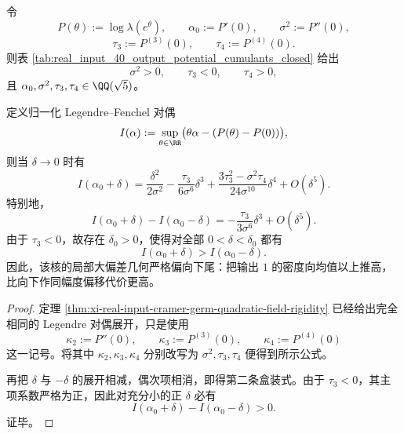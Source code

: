 \begin{theorem}[实输入四十状态核的局部大偏差率函数严格偏向下尾]\label{thm:xi-real-input40-local-rate-strict-downward-asymmetry}
令
\[
P(\theta):=\log\lambda(e^\theta),
\qquad
\alpha_0:=P'(0),
\qquad
\sigma^2:=P''(0),
\]
\[
\tau_3:=P^{(3)}(0),
\qquad
\tau_4:=P^{(4)}(0).
\]
则表 \ref{tab:real_input_40_output_potential_cumulants_closed} 给出
\[
\sigma^2>0,
\qquad
\tau_3<0,
\qquad
\tau_4>0,
\]
且 \(\alpha_0,\sigma^2,\tau_3,\tau_4\in\QQ(\sqrt5)\)。

定义归一化 Legendre--Fenchel 对偶
\[
I(\alpha):=\sup_{\theta\in\RR}\bigl(\theta\alpha-(P(\theta)-P(0))\bigr),
\]
则当 \(\delta\to 0\) 时有
\[
\boxed{\;
I(\alpha_0+\delta)
=
\frac{\delta^2}{2\sigma^2}
-\frac{\tau_3}{6\sigma^6}\delta^3
+\frac{3\tau_3^2-\sigma^2\tau_4}{24\sigma^{10}}\delta^4
+O(\delta^5).\;}
\]
特别地，
\[
\boxed{\;
I(\alpha_0+\delta)-I(\alpha_0-\delta)
=
-\frac{\tau_3}{3\sigma^6}\delta^3
+O(\delta^5).\;}
\]
由于 \(\tau_3<0\)，故存在 \(\delta_0>0\)，使得对全部 \(0<\delta<\delta_0\) 都有
\[
I(\alpha_0+\delta)>I(\alpha_0-\delta).
\]
因此，该核的局部大偏差几何严格偏向下尾：把输出 \(1\) 的密度向均值以上推高，比向下作同幅度偏移代价更高。
\end{theorem}
\begin{proof}
定理 \ref{thm:xi-real-input-cramer-germ-quadratic-field-rigidity} 已经给出完全相同的 Legendre 对偶展开，只是使用
\[
\kappa_2:=P''(0),\qquad \kappa_3:=P^{(3)}(0),\qquad \kappa_4:=P^{(4)}(0)
\]
这一记号。将其中
\(
\kappa_2,\kappa_3,\kappa_4
\)
分别改写为
\(
\sigma^2,\tau_3,\tau_4
\)
便得到所示公式。

再把 \(\delta\) 与 \(-\delta\) 的展开相减，偶次项相消，即得第二条盒装式。由于 \(\tau_3<0\)，其主项系数严格为正，因此对充分小的正 \(\delta\) 必有
\[
I(\alpha_0+\delta)-I(\alpha_0-\delta)>0.
\]
证毕。
\end{proof}

\endinput

